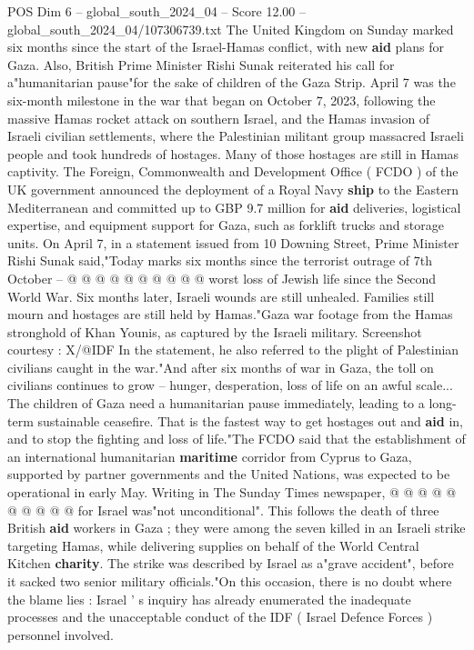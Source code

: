 \begin{textsample}{POS Dim 6 – global\_south\_2024\_04 – Score 12.00 – global\_south\_2024\_04/107306739.txt}  \label{ex:f6_pos_081}
The United Kingdom on Sunday marked six months since the start of the Israel-Hamas conflict, with new \textbf{aid} plans for Gaza.
Also, British Prime Minister Rishi Sunak reiterated his call for a"humanitarian pause"for the sake of children of the Gaza Strip.
April 7 was the six-month milestone in the war that began on October 7, 2023, following the massive Hamas rocket attack on southern Israel, and the Hamas invasion of Israeli civilian settlements, where the Palestinian militant group massacred Israeli people and took hundreds of hostages.
Many of those hostages are still in Hamas captivity.
The Foreign, Commonwealth and Development Office ( FCDO ) of the UK government announced the deployment of a Royal Navy \textbf{ship} to the Eastern Mediterranean and committed up to GBP 9.7 million for \textbf{aid} deliveries, logistical expertise, and equipment support for Gaza, such as forklift trucks and storage units.
On April 7, in a statement issued from 10 Downing Street, Prime Minister Rishi Sunak said,"Today marks six months since the terrorist outrage of 7th October -- @ @ @ @ @ @ @ @ @ @ worst loss of Jewish life since the Second World War.
Six months later, Israeli wounds are still unhealed.
Families still mourn and hostages are still held by Hamas."Gaza war footage from the Hamas stronghold of Khan Younis, as captured by the Israeli military.
Screenshot courtesy : X/@IDF In the statement, he also referred to the plight of Palestinian civilians caught in the war."And after six months of war in Gaza, the toll on civilians continues to grow -- hunger, desperation, loss of life on an awful scale...
The children of Gaza need a humanitarian pause immediately, leading to a long-term sustainable ceasefire.
That is the fastest way to get hostages out and \textbf{aid} in, and to stop the fighting and loss of life."The FCDO said that the establishment of an international humanitarian \textbf{maritime} corridor from Cyprus to Gaza, supported by partner governments and the United Nations, was expected to be operational in early May.
Writing in The Sunday Times newspaper, @ @ @ @ @ @ @ @ @ @ for Israel was"not unconditional".
This follows the death of three British \textbf{aid} workers in Gaza ; they were among the seven killed in an Israeli strike targeting Hamas, while delivering supplies on behalf of the World Central Kitchen \textbf{charity}.
The strike was described by Israel as a"grave accident", before it sacked two senior military officials."On this occasion, there is no doubt where the blame lies : Israel ' s inquiry has already enumerated the inadequate processes and the unacceptable conduct of the IDF ( Israel Defence Forces ) personnel involved.

\end{textsample}
